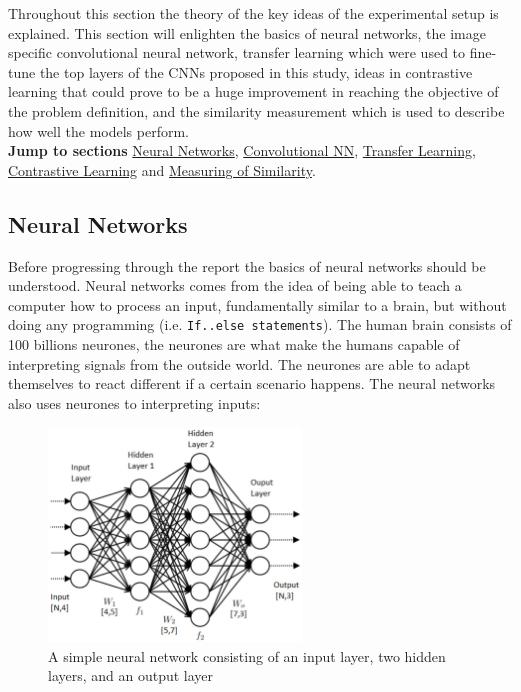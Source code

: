 Throughout this section the theory of the key ideas of the experimental setup is explained. This section will enlighten the basics of neural networks, the image specific convolutional neural network, transfer learning which were used to fine-tune the top layers of the CNNs proposed in this study, ideas in contrastive learning that could prove to be a huge improvement in reaching the objective of the problem definition, and the similarity measurement which is used to describe how well the models perform. \\
\textbf{Jump to sections} \hyperref[sec:Neural]{Neural Networks}, \hyperref[sec:Convolutional]{Convolutional NN}, \hyperref[sec:Transfer]{Transfer Learning}, \hyperref[sec:contrastive]{Contrastive Learning} and \hyperref[sec:Similarity]{Measuring of Similarity}.
\subsection{Neural Networks}\label{sec:Neural}
Before progressing through the report the basics of neural networks should be understood.
Neural networks comes from the idea of being able to teach a computer how to process an input, fundamentally similar to a brain, but without doing any programming (i.e. \texttt{If..else statements}).
The human brain consists of 100 billions neurones, the neurones are what make the humans capable of interpreting signals from the outside world. The neurones are able to adapt themselves to react different if a certain scenario happens. The neural networks also uses neurones to interpreting inputs:
\begin{figure}[H]
    \centering
    \includegraphics[width = 0.6\textwidth]{pictures/random/simpleneuralnetwork}
    \caption{A simple neural network consisting of an input layer, two hidden layers, and an output layer}
    \label{ref:Loss}
\end{figure}
